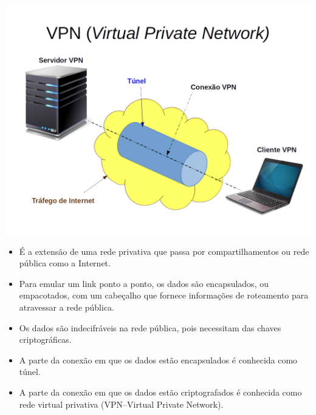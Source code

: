 
\lecturetitle{\course}{\insertlecture}

\frame{\maketitle}

\begin{frame}{}
  \includegraphics[scale=.39]{img/vpn.png}
\end{frame}

\begin{frame}{\insertlecture}\small

  \begin{itemize}[<+->]
  \item É a extensão de uma rede privativa que passa por
    compartilhamentos ou rede pública como a Internet.
  \item Para emular um link ponto a ponto, os dados são encapsulados,
    ou empacotados, com um cabeçalho que fornece informações de
    roteamento para atravessar a rede pública.
  \item Os dados são indecifráveis na rede pública, pois necessitam
    das chaves criptográficas.
  \item A parte da conexão em que os dados estão encapsulados é
    conhecida como túnel.
  \item A parte da conexão em que os dados estão criptografados é
    conhecida como rede virtual privativa (VPN–Virtual Private
    Network).
  \end{itemize}
  
\end{frame}

